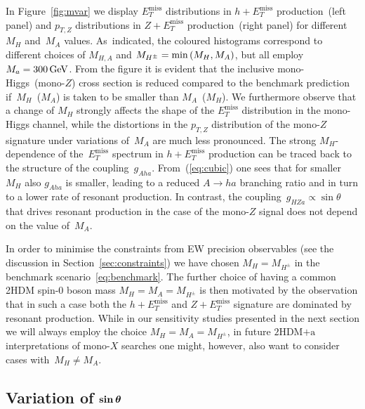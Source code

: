 \documentclass[a4paper, 11pt,notoc]{article}
\newcommand{\MET}{\ensuremath{E_T^\mathrm{miss}}\xspace}
\newcommand{\mA}{\ensuremath{M_{A}}\xspace}
\newcommand{\mH}{\ensuremath{M_{H}}\xspace}
\newcommand{\mHc}{\ensuremath{M_{H^{\pm}}}\xspace}
\newcommand{\hdma}{\ensuremath{\textrm{2HDM+a}}\xspace}
\def\bm#1{\mbox{\boldmath$#1$\unboldmath}}
\begin{document}
In Figure~\ref{fig:mvar} we display $\MET$ distributions in $h + \MET$ production~(left panel) and $p_{T,Z}$ distributions in $Z+\MET$ production~(right panel) for different~$\mH$ and~$\mA$ values. As~indicated, the coloured histograms correspond to  different choices of $M_{H,A}$ and $\mHc = {\rm min} \left ( \mH, \mA \right )$, but all employ $M_a = 300 \, {\rm GeV}$. From the figure it is evident that the inclusive mono-Higgs~(mono-$Z$) cross section is reduced compared to the benchmark prediction if~$\mH$~($\mA$) is taken to be smaller than $\mA$~($\mH$).  We furthermore observe that  a change of $\mH$ strongly affects the shape of the $\MET$ distribution in the mono-Higgs channel, while the distortions in the $p_{T,Z}$ distribution of the mono-$Z$ signature under variations of~$\mA$ are much less pronounced. The strong $M_H$-dependence of the~$\MET$ spectrum in $h + \MET$ production can be traced back to the structure of the coupling~$g_{Aha}$. From~(\ref{eq:cubic}) one sees that for smaller~$M_H$ also $g_{Aha}$ is smaller, leading to a reduced $A \to ha$ branching ratio  and in turn to a lower rate of resonant production.  In contrast, the coupling~$g_{HZa} \propto \sin \theta$ that drives resonant production in the case of the mono-$Z$ signal does not depend on the value of~$M_A$.

In order to minimise the constraints from EW precision observables (see the discussion in Section~\ref{sec:constraints}) we have chosen $\mH = \mHc$ in the  benchmark scenario~\eqref{eq:benchmark}. The further choice of having a common 2HDM  spin-0 boson  mass $\mH = \mA = \mHc$ is then motivated by the observation that in such a case  both the $h + \MET$ and $Z + \MET$ signature are dominated by resonant production. While in our sensitivity studies presented in the next section we will always employ the choice $\mH = \mA = \mHc$, in future \hdma  interpretations of mono-$X$ searches one might, however,  also want to consider cases with~$\mH \neq \mA$. 

\subsection*{Variation of $\bm{\sin \theta}$}
\end{document}
